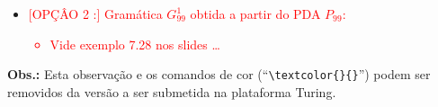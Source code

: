 \documentclass[12pt]{article}
\def\myling{{99}} %
\begin{document}
\begin{itemize}
\begin{itemize}
\begin{center}
     \end{center}

   \end{itemize}
  \item \textcolor{red}{[OPÇÂO 2 :] Gramática $G^1_{\myling}$ obtida a partir do PDA $P_{\myling}$:
   \begin{itemize}
    \item Vide exemplo 7.28 nos slides \ldots {\Large \Smiley}
   \end{itemize}
}
  \end{itemize}
%
\noindent\textbf{Obs.:} Esta observação e os comandos de cor (``\verb|\textcolor{}{}|'') podem ser removidos da versão a ser submetida na plataforma Turing.
\end{document}
